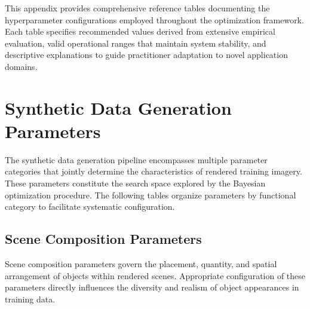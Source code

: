 
This appendix provides comprehensive reference tables documenting the hyperparameter configurations employed throughout the optimization framework. Each table specifies recommended values derived from extensive empirical evaluation, valid operational ranges that maintain system stability, and descriptive explanations to guide practitioner adaptation to novel application domains.

\section{Synthetic Data Generation Parameters}
\label{sec:synth_params}

The synthetic data generation pipeline encompasses multiple parameter categories that jointly determine the characteristics of rendered training imagery. These parameters constitute the search space explored by the Bayesian optimization procedure. The following tables organize parameters by functional category to facilitate systematic configuration.

\subsection{Scene Composition Parameters}

Scene composition parameters govern the placement, quantity, and spatial arrangement of objects within rendered scenes. Appropriate configuration of these parameters directly influences the diversity and realism of object appearances in training data.

